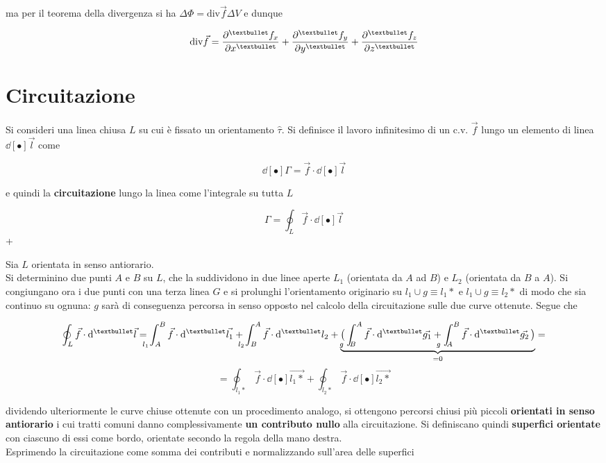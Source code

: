 ma per il teorema della divergenza si ha $\Delta \Phi = \mathrm{div} \vec{f} \Delta V$ e dunque

\[\mathrm{div} \vec{f} = \pdv[•]{f_x}{x} + \pdv[•]{f_y}{y} + \pdv[•]{f_z}{z}\]

\section{Circuitazione}

Si consideri una linea chiusa $L$ su cui è fissato un orientamento $\hat{\tau}$. Si definisce il lavoro infinitesimo di un c.v. $\vec{f}$ lungo un elemento di linea $\dd[•]{\vec{l}}$ come

\[\dd[•]{\Gamma} = \vec{f} \cdot \dd[•]{\vec{l}}\]

e quindi la \textbf{circuitazione} lungo la linea come l'integrale su tutta $L$

\[\Gamma = \oint_L \vec{f} \cdot \dd[•]{\vec{l}}\]+

Sia $L$ orientata in senso antiorario. 
\\Si determinino due punti $A$ e $B$ su $L$, che la suddividono in due linee aperte $L_1$ (orientata da $A$ ad $B$) e $L_2$ (orientata da $B$ a $A$). Si congiungano ora i due punti con una terza linea $G$ e si prolunghi l'orientamento originario su $l_1 \cup g \equiv l_1*$ e $l_1 \cup g \equiv l_2*$ di modo che sia continuo su ognuna: $g$ sarà di conseguenza percorsa in senso opposto nel calcolo della circuitazione sulle due curve ottenute. Segue che

\[\oint_L \vec{f} \cdot \dd[•]{\vec{l}} = \int_{\hspace{-0.45cm} l_1 \hspace{0.22cm} A}^B \vec{f} \cdot \dd[•]{\vec{l_1}} + \int_{\hspace{-0.45cm} l_2 \hspace{0.22cm} B}^A \vec{f} \cdot \dd[•]{l_2} + \underbrace{\big(\int_{\hspace{-0.45cm} g \hspace{0.22cm} B}^A \vec{f} \cdot \dd[•]{\vec{g_1}} + \int_{\hspace{-0.45cm} g \hspace{0.22cm} A}^B \vec{f} \cdot \dd[•]{\vec{g_2}}\big)}_{= 0} = \]
\[= \oint_{l_1*} \vec{f} \cdot \dd[•]{\vec{l_1*}} + \oint_{l_2*} \vec{f} \cdot \dd[•]{\vec{l_2*}}\]

dividendo ulteriormente le curve chiuse ottenute con un procedimento analogo, si ottengono 
percorsi chiusi più piccoli \textbf{orientati in senso antiorario} i cui tratti comuni danno complessivamente \textbf{un contributo nullo} alla circuitazione. Si definiscano quindi \textbf{superfici orientate} con ciascuno di essi come bordo, orientate secondo la regola della mano destra.
\\Esprimendo la circuitazione come somma dei contributi e normalizzando sull'area delle superfici

